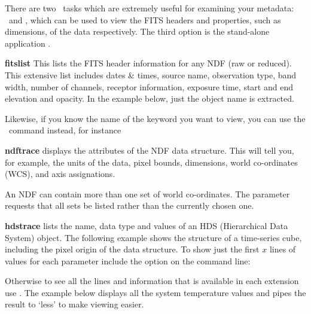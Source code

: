 \documentclass[11pt,oneside,chapters]{starlink}
\begin{document}
There are two \Kappa\ tasks which are extremely useful for examining
your metadata: \fitslist\ and \ndftrace, which can be used to view the
FITS headers and properties, such as dimensions, of the data
respectively. The third option is the stand-alone application
\HDSTRACE.
\vspace{0.7cm}\\
\begin{aligndesc}
\item[\textbf{fitslist}]
This lists the FITS header information
for any NDF (raw or reduced). This extensive list includes dates \&
times, source name, observation type, band width, number of channels,
receptor information, exposure time, start and end elevation and
opacity. In the example below, just the object name is extracted.
\begin{terminalv}
\end{terminalv}
Likewise, if you know the name of the keyword you want to view, you can
use the \fitsval\ command instead, for instance
\begin{terminalv}
\end{terminalv}

\item[\textbf{ndftrace}]
 displays the attributes of the NDF data structure.
This will tell you, for example, the units of the data, pixel bounds,
dimensions, world co-ordinates (WCS), and axis assignations.
\begin{terminalv}
\end{terminalv}

An NDF can contain more than one set of world co-ordinates. The
 parameter requests that all sets be listed rather
than the currently chosen one.

\item[\textbf{hdstrace}]
 lists the name, data type and values of an HDS
(Hierarchical Data System) object. The following example shows the
structure of a time-series cube, including the pixel origin of the
data structure. To show just the first $x$ lines of values for each
parameter include the option  on the command line:
\begin{terminalv}
\end{terminalv}
Otherwise to see all the lines and information that is available in
each extension use . The example below displays all
the system temperature values and pipes the result to `less' to make
viewing easier.
\begin{terminalv}
\end{terminalv}
\end{aligndesc}
\vspace{0.4cm}
\end{document}
